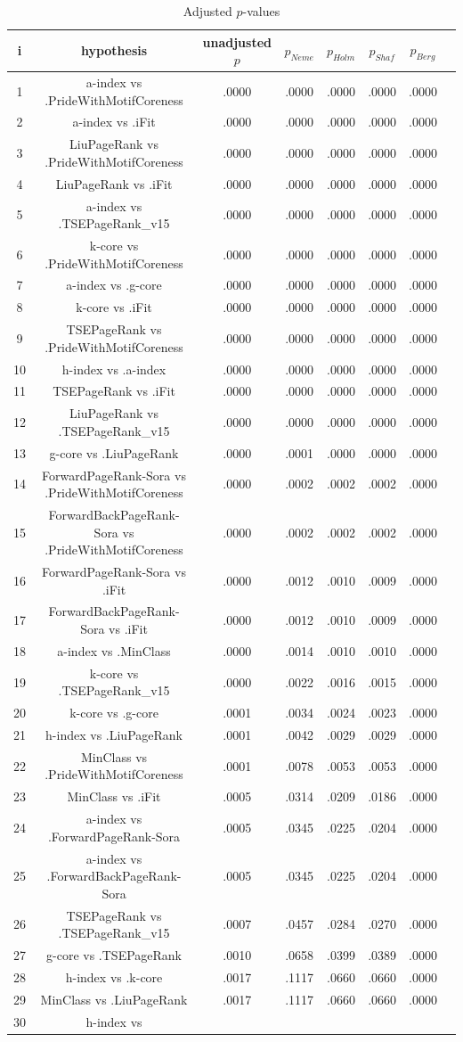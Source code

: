 \documentclass[a4paper,10pt]{article}
\begin{document}
\begin{landscape}
\begin{table}[!htp]
\centering\tiny
\caption{Adjusted $p$-values}
\begin{tabular}{cccccccc}
i&hypothesis&unadjusted $p$&$p_{Neme}$&$p_{Holm}$&$p_{Shaf}$&$p_{Berg}$\\
\hline
1&a-index vs .PrideWithMotifCoreness&.0000&.0000&.0000&.0000&.0000\\2&a-index vs .iFit&.0000&.0000&.0000&.0000&.0000\\3&LiuPageRank vs .PrideWithMotifCoreness&.0000&.0000&.0000&.0000&.0000\\4&LiuPageRank vs .iFit&.0000&.0000&.0000&.0000&.0000\\5&a-index vs .TSEPageRank_v15&.0000&.0000&.0000&.0000&.0000\\6&k-core vs .PrideWithMotifCoreness&.0000&.0000&.0000&.0000&.0000\\7&a-index vs .g-core&.0000&.0000&.0000&.0000&.0000\\8&k-core vs .iFit&.0000&.0000&.0000&.0000&.0000\\9&TSEPageRank vs .PrideWithMotifCoreness&.0000&.0000&.0000&.0000&.0000\\10&h-index vs .a-index&.0000&.0000&.0000&.0000&.0000\\11&TSEPageRank vs .iFit&.0000&.0000&.0000&.0000&.0000\\12&LiuPageRank vs .TSEPageRank_v15&.0000&.0000&.0000&.0000&.0000\\13&g-core vs .LiuPageRank&.0000&.0001&.0000&.0000&.0000\\14&ForwardPageRank-Sora vs .PrideWithMotifCoreness&.0000&.0002&.0002&.0002&.0000\\15&ForwardBackPageRank-Sora vs .PrideWithMotifCoreness&.0000&.0002&.0002&.0002&.0000\\16&ForwardPageRank-Sora vs .iFit&.0000&.0012&.0010&.0009&.0000\\17&ForwardBackPageRank-Sora vs .iFit&.0000&.0012&.0010&.0009&.0000\\18&a-index vs .MinClass&.0000&.0014&.0010&.0010&.0000\\19&k-core vs .TSEPageRank_v15&.0000&.0022&.0016&.0015&.0000\\20&k-core vs .g-core&.0001&.0034&.0024&.0023&.0000\\21&h-index vs .LiuPageRank&.0001&.0042&.0029&.0029&.0000\\22&MinClass vs .PrideWithMotifCoreness&.0001&.0078&.0053&.0053&.0000\\23&MinClass vs .iFit&.0005&.0314&.0209&.0186&.0000\\24&a-index vs .ForwardPageRank-Sora&.0005&.0345&.0225&.0204&.0000\\25&a-index vs .ForwardBackPageRank-Sora&.0005&.0345&.0225&.0204&.0000\\26&TSEPageRank vs .TSEPageRank_v15&.0007&.0457&.0284&.0270&.0000\\27&g-core vs .TSEPageRank&.0010&.0658&.0399&.0389&.0000\\28&h-index vs .k-core&.0017&.1117&.0660&.0660&.0000\\29&MinClass vs .LiuPageRank&.0017&.1117&.0660&.0660&.0000\\30&h-index vs 
\end{tabular}
\end{table}
\end{landscape}
\end{document}
